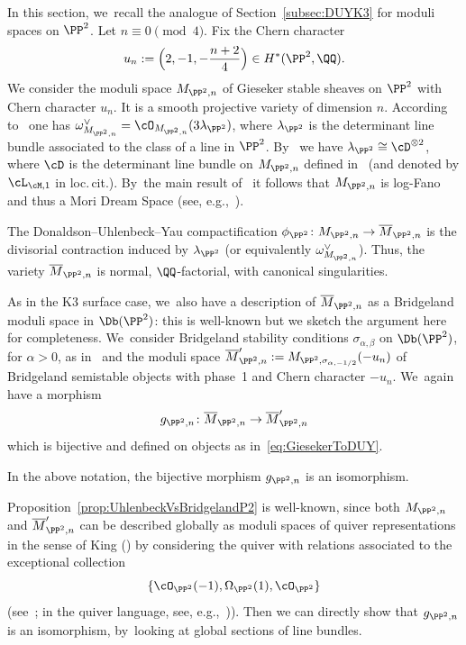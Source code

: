 \label{subsec:DUYP2}

In this section, we~recall the analogue of Section~\ref{subsec:DUYK3} for moduli spaces on $\PP^2$.
Let $n\equiv 0 \pmod 4$.
Fix the Chern character
\[
u_n:=\Bigl(2, -1, -\frac{n+2}{4} \Bigr)\in H^*(\PP^2,\QQ).
\]
We consider the moduli space $M_{\PP^2,n}$ of Gieseker stable sheaves on $\PP^2$ with Chern character $u_n$.
It is a smooth projective variety of dimension $n$. According to~\cite[Th.\,8.3.3]{HL:moduli} one has $\omega_{M_{\PP^2,n}}^\vee = \cO_{M_{\PP^2,n}}(3\lambda_{\PP^2})$, where $\lambda_{\PP^2}$ is the determinant line bundle associated to the class of a line in $\PP^2$. By~\cite[Lem.\,8.3.4]{HL:moduli} we have $\lambda_{\PP^2}\cong \cD^{\otimes 2}$, where $\cD$ is the determinant line bundle on $M_{\PP^2,n}$ defined in~\cite{Li:uhlencomp} (and denoted by $\cL_{\cM,1}$ in loc.\,cit.). By~the main result of~\cite{Li:uhlencomp} it follows that $M_{\PP^2,n}$ is log-Fano and thus a Mori Dream Space (see, e.g.,~\cite[Ex.\,3.2]{Castravet:MDS}).

The Donaldson--Uhlenbeck--Yau compactification $\phi_{\PP^2}\colon M_{\PP^2,n}\to \overline{M}_{\PP^2,n}$ is the divisorial contraction induced by $\lambda_{\PP^2}$ (or equivalently $\omega_{M_{\PP^2,n}}^\vee$).
Thus, the variety $\overline{M}_{\PP^2,n}$ is normal, $\QQ$-factorial, with canonical singularities.

As in the K3 surface case, we~also have a description of $\overline{M}_{\PP^2,n}$ as a Bridgeland moduli space in $\Db(\PP^2)$: this is well-known but we sketch the argument here for completeness. We~consider Bridgeland stability conditions $\sigma_{\alpha,\beta}$ on $\Db(\PP^2)$, for $\alpha>0$, as in~\cite[Th.\,6.10]{MS:lectures} and the moduli space $\overline{M}_{\PP^2,n}':=M_{\PP^2,\sigma_{\alpha,-1/2}}(-u_n)$ of Bridgeland semistable objects with phase~1 and Chern character $-u_n$. We~again have a morphism
\[
g_{\PP^2,n}\colon \overline{M}_{\PP^2,n} \to \overline{M}_{\PP^2,n}'
\]
which is bijective and defined on objects as in~\eqref{eq:GiesekerToDUY}.

\begin{prop}\label{prop:UhlenbeckVsBridgelandP2}
In the above notation, the bijective morphism $g_{\PP^2,n}$ is an isomorphism.
\end{prop}

Proposition~\ref{prop:UhlenbeckVsBridgelandP2} is well-known, since both $M_{\PP^2,n}$ and $\overline{M}_{\PP^2,n}'$ can be described globally as moduli spaces of quiver representations in the sense of King (\cite{King:Moduli}) by considering the quiver with relations associated to the exceptional collection
\[
\left\{\cO_{\PP^2}(-1), \Omega_{\PP^2}(1), \cO_{\PP^2} \right\}
\]
(see~\cite{DLP}; in the quiver language, see, e.g.,~\cite[Main\,Th.\,1.3]{Okhawa:P2})).
Then we can directly show that $g_{\PP^2,n}$ is an isomorphism, by~looking at global sections of line bundles.

